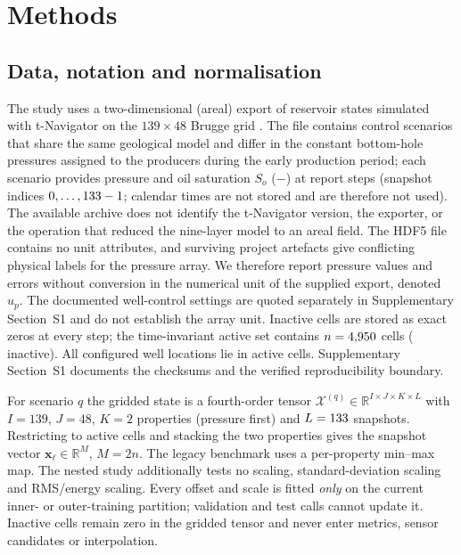 \section{Methods}
\label{sec:methods}

\subsection{Data, notation and normalisation}
\label{sec:data}
The study uses a two-dimensional (areal) export of reservoir states simulated with t-Navigator on the $139\times48$ Brugge grid \cite{peters2010brugge}. The file contains \NRuns{} control scenarios that share the same geological model and differ in the constant bottom-hole pressures assigned to the producers during the early production period; each scenario provides pressure and oil saturation $S_o$ ($-$) at \NT{} report steps (snapshot indices $0,\dots,133-1$; calendar times are not stored and are therefore not used). The available archive does not identify the t-Navigator version, the exporter, or the operation that reduced the nine-layer model to an areal field. The HDF5 file contains no unit attributes, and surviving project artefacts give conflicting physical labels for the pressure array. We therefore report pressure values and errors without conversion in the numerical unit of the supplied export, denoted $u_p$. The documented well-control settings are quoted separately in Supplementary Section~S1 and do not establish the array unit. Inactive cells are stored as exact zeros at every step; the time-invariant active set contains $n=4{,}950$ cells (\NInactive{} inactive). All \NWells{} configured well locations lie in active cells. Supplementary Section~S1 documents the checksums and the verified reproducibility boundary.

For scenario $q$ the gridded state is a fourth-order tensor $\mathcal{X}^{(q)}\in\mathbb{R}^{I\times J\times K\times L}$ with $I=139$, $J=48$, $K=2$ properties (pressure first) and $L=133$ snapshots. Restricting to active cells and stacking the two properties gives the snapshot vector $\mathbf{x}_\ell\in\mathbb{R}^{M}$, $M=2n$. The legacy benchmark uses a per-property min--max map. The nested study additionally tests no scaling, standard-deviation scaling and RMS/energy scaling. Every offset and scale is fitted \emph{only} on the current inner- or outer-training partition; validation and test calls cannot update it. Inactive cells remain zero in the gridded tensor and never enter metrics, sensor candidates or interpolation.

